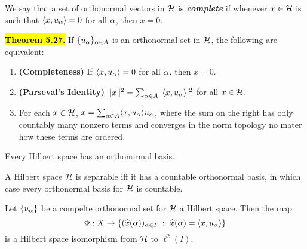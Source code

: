 \vs

\dfn We say that a set of orthonormal vectors in $\mathcal{H}$ is \textbf{\textit{complete}} if whenever $x\in\mathcal{H}$ is such that $\langle x,u_\alpha\rangle = 0$ for all $\alpha$, then $x = 0$.

\vs

\hl{\textbf{Theorem 5.27.}} If $\{u_\alpha\}_{\alpha\in A}$ is an orthonormal set in $\mathcal{H}$, the following are equivalent:
\begin{enumerate}
    \item \textbf{(Completeness)} If $\langle x,u_\alpha\rangle = 0$ for all $\alpha$, then $x = 0$.
    \item \textbf{(Parseval's Identity)} $\|x\|^2 = \sum_{\alpha\in A} |\langle x,u_\alpha\rangle|^2$ for all $x\in \mathcal{H}$.
    \item For each $x\in \mathcal{H}$, $x = \sum_{\alpha\in A}\langle x,u_\alpha\rangle u_\alpha$, where the sum on the right has only countably many nonzero terms and converges in the norm topology no mater how these terms are ordered.
\end{enumerate}

\vs

\setcounter{thm}{27}
\begin{prop}
Every Hilbert space has an orthonormal basis.
\end{prop}

\vs

\begin{prop}
A Hilbert space $\mathcal{H}$ is separable iff it has a countable orthonormal basis, in which case every orthonormal basis for $\mathcal{H}$ is countable.
\end{prop}

\vs

\begin{prop}
Let $\{u_\alpha\}$ be a compelte orthonormal set for $\mathcal{H}$ a Hilbert space. Then the map
\[\Phi:X\rightarrow \{(\widehat x(\alpha))_{\alpha\in I}\ :\ \widehat x(\alpha) = \langle x,u_\alpha\rangle\}\]
is a Hilbert space isomorphism from $\mathcal{H}$ to $\ell^2(I)$.
\end{prop}